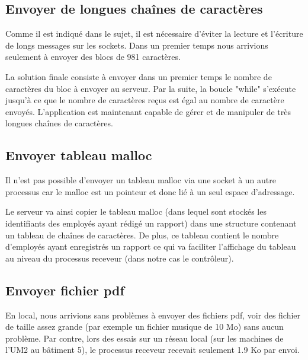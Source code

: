 %
%


\subsection{Envoyer de longues chaînes de caractères}

Comme il est indiqué dans le sujet, il est nécessaire d'éviter la lecture et l'écriture de longs messages sur les sockets. Dans un premier temps nous arrivions seulement à envoyer des blocs de 981  caractères.

La solution finale consiste à envoyer dans un premier temps le nombre de caractères du bloc à envoyer au serveur. Par la suite, la boucle "while" s'exécute jusqu'à ce que le nombre de caractères reçus est égal au nombre de caractère envoyés. L'application est maintenant capable de gérer et de manipuler de très longues chaînes de caractères.


\subsection{Envoyer tableau malloc}
Il n'est pas possible d'envoyer un tableau malloc via une socket à un autre processus car le malloc est un pointeur et donc lié à un seul espace d'adressage.

Le serveur va ainsi copier le tableau malloc (dans lequel sont stockés les identifiants des employés ayant rédigé un rapport) dans une structure contenant un tableau de chaînes de caractères. De plus, ce tableau contient le nombre d'employés ayant enregistrés un rapport ce qui va faciliter l'affichage du tableau au niveau du processus receveur (dans notre cas le contrôleur).

\subsection{Envoyer fichier pdf}
En local, nous arrivions sans problèmes à envoyer des fichiers pdf, voir des fichier de taille assez grande (par exemple un fichier musique de 10 Mo) sans aucun problème. Par contre, lors des essais sur un réseau local (sur les machines de l'UM2 au bâtiment 5), le processus receveur recevait seulement 1.9 Ko par envoi.

